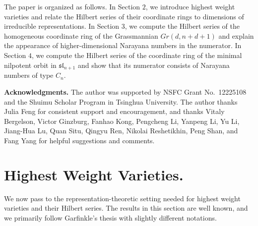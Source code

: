 \documentclass[12pt]{extarticle}
\theoremstyle{plain}
\theoremstyle{definition}
\theoremstyle{remark}
\begin{document}
The paper is organized as follows. In Section $2$, we introduce highest weight varieties and relate the Hilbert series of their coordinate rings to dimensions of irreducible representations. In Section $3$, we compute the Hilbert series of the homogeneous coordinate ring of the Grassmannian $Gr(d,n+d+1)$ and explain the appearance of higher-dimensional Narayana numbers in the numerator. In Section $4$, we compute the Hilbert series of the coordinate ring of the minimal nilpotent orbit in $\mathfrak{sl}_{n+1}$ and show that its numerator consists of Narayana numbers of type $C_n$.

\vspace{2em}
\textbf{Acknowledgments.}
The author was supported by NSFC Grant No.~12225108 and the Shuimu Scholar Program in Tsinghua University. The author thanks Julia Feng for consistent support and encouragement, and thanks Vitaly Bergelson, Victor Ginzburg, Fanhao Kong, Pengcheng Li, Yanpeng Li, Yu Li, Jiang-Hua Lu, Quan Situ, Qingyu Ren, Nikolai Reshetikhin, Peng Shan, and Fang Yang for helpful suggestions and comments.


\section{Highest Weight Varieties.}
We now pass to the representation-theoretic setting needed for highest weight varieties and their Hilbert series.
The results in this section are well known, and we primarily follow Garfinkle's thesis \cite{Garfinkle} with slightly different notations.
\end{document}
